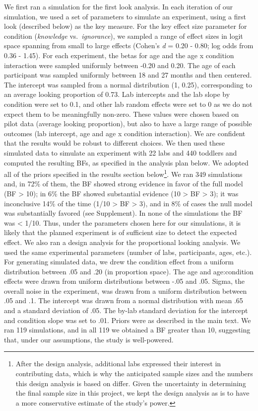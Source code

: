 \documentclass[
  man,floatsintext]{apa6}
\begin{document}
We first ran a simulation for the first look analysis. In each iteration of our simulation, we used a set of parameters to simulate an experiment, using a first look (described below) as the key measure. For the key effect size parameter for condition (\emph{knowledge} vs.~\emph{ignorance}), we sampled a range of effect sizes in logit space spanning from small to large effects (Cohen's \emph{d} = 0.20 - 0.80; log odds from 0.36 - 1.45). For each experiment, the betas for age and the age x condition interaction were sampled uniformly between -0.20 and 0.20. The age of each participant was sampled uniformly between 18 and 27 months and then centered. The intercept was sampled from a normal distribution (1, 0.25), corresponding to an average looking proportion of 0.73. Lab intercepts and the lab slope by condition were set to 0.1, and other lab random effects were set to 0 as we do not expect them to be meaningfully non-zero. These values were chosen based on pilot data (average looking proportion), but also to have a large range of possible outcomes (lab intercept, age and age x condition interaction). We are confident that the results would be robust to different choices. We then used these simulated data to simulate an experiment with 22 labs and 440 toddlers and computed the resulting BFs, as specified in the analysis plan below. We adopted all of the priors specified in the results section below\footnote{After the design analysis, additional labs expressed their interest in contributing data, which is why the anticipated sample sizes and the numbers this design analysis is based on differ. Given the uncertainty in determining the final sample size in this project, we kept the design analysis as is to have a more conservative estimate of the study's power.}. We ran 349 simulations and, in 72\% of them, the BF showed strong evidence in favor of the full model (BF \textgreater{} 10); in 6\% the BF showed substantial evidence (10 \textgreater{} BF \textgreater{} 3); it was inconclusive 14\% of the time (1/10 \textgreater{} BF \textgreater{} 3), and in 8\% of cases the null model was substantially favored (see Supplement). In none of the simulations the BF was \textless{} 1/10. Thus, under the parameters chosen here for our simulations, it is likely that the planned experiment is of sufficient size to detect the expected effect.
We also ran a design analysis for the proportional looking analysis. We used the same experimental parameters (number of labs, participants, ages, etc.). For generating simulated data, we drew the condition effect from a uniform distribution between .05 and .20 (in proportion space). The age and age:condition effects were drawn from uniform distributions between -.05 and .05. Sigma, the overall noise in the experiment, was drawn from a uniform distribution between .05 and .1. The intercept was drawn from a normal distribution with mean .65 and a standard deviation of .05. The by-lab standard deviation for the intercept and condition slope was set to .01. Priors were as described in the main text. We ran 119 simulations, and in all 119 we obtained a BF greater than 10, suggesting that, under our assumptions, the study is well-powered.
\end{document}
